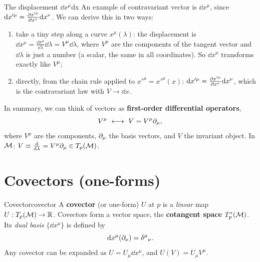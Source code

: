 \begin{example}{The displacement $\dd x^\mu$}{dx}
An example of contravariant vector is $\dd x^\mu$, since $\mathrm{d} x'^\mu=\frac{\partial x'^\mu}{\partial x^\nu}\mathrm{d} x^\nu$. We can derive this in two ways:
\begin{enumerate}[nosep]
\item take a tiny step along a curve $x^\mu(\lambda)$: the displacement is $\dd x^\mu=\frac{\dd x^\mu}{\dd\lambda}\dd\lambda=V^\mu\dd\lambda$, where $V^\mu$ are the components of the tangent vector and $\dd\lambda$ is just a number (a scalar, the same in all coordinates). So $\dd x^\mu$ transforms exactly like $V^\mu$;
\item directly, from the chain rule applied to $x'^\mu=x'^\mu(x)$: $\mathrm{d} x'^\mu=\frac{\partial x'^\mu}{\partial x^\nu}\mathrm{d} x^\nu$, which is the contravariant law with $V\to\dd x$.
\end{enumerate}
\end{example}

In summary, we can think of vectors as \textbf{first-order differential operators},
\begin{equation}
  V^\mu\ \longleftrightarrow\ V=V^\mu\pd_\mu,
\end{equation}
where $V^\mu$ are the components, $\partial_\mu$ the basis vectors, and $V$ the invariant object. In $\mathcal{M}$: $V\equiv\frac{\mathrm{d}}{\mathrm{d}\lambda}=V^\mu\partial_\mu\in T_p(\mathcal{M})$.

\section{Covectors (one-forms)}

\begin{definition}{Covector}{covector}
A \textbf{covector} (or one-form) $U$ at $p$ is a \emph{linear} map $U:T_p(\mathcal{M})\to\mathbb{R}$. Covectors form a vector space, the \textbf{cotangent space} $T_p^*(\mathcal{M})$. Its \emph{dual basis} $\{\dd x^\mu\}$ is defined by
\begin{equation}
  \mathrm{d} x^\mu(\partial_\nu)=\delta^\mu{}_\nu .
\end{equation}
Any covector can be expanded as $U=U_\mu\dd x^\mu$, and $U(V)=U_\mu V^\mu$.
\end{definition}

